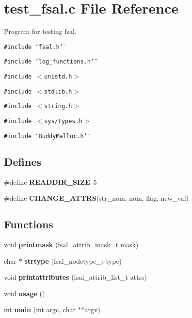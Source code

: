 \section{test\_\-fsal.c File Reference}
\label{test__fsal_8c}
Program for testing fsal.  


{\tt \#include \char`\"{}fsal.h\char`\"{}}\par
{\tt \#include \char`\"{}log\_\-functions.h\char`\"{}}\par
{\tt \#include $<$unistd.h$>$}\par
{\tt \#include $<$stdlib.h$>$}\par
{\tt \#include $<$string.h$>$}\par
{\tt \#include $<$sys/types.h$>$}\par
{\tt \#include \char`\"{}BuddyMalloc.h\char`\"{}}\par
\subsection*{Defines}
\begin{CompactItemize}
\item 
\#define \textbf{READDIR\_\-SIZE}~5\label{test__fsal_8c_23f27c010a8ef80f23da9070400f3244}

\item 
\#define \textbf{CHANGE\_\-ATTRS}(str\_\-nom, nom, flag, new\_\-val)
\end{CompactItemize}
\subsection*{Functions}
\begin{CompactItemize}
\item 
void \textbf{printmask} (fsal\_\-attrib\_\-mask\_\-t mask)\label{test__fsal_8c_97f533a652ce754b0d9faf4a52572e62}

\item 
char $\ast$ \textbf{strtype} (fsal\_\-nodetype\_\-t type)\label{test__fsal_8c_55da3e758cacb2e7378990063ef42124}

\item 
void \textbf{printattributes} (fsal\_\-attrib\_\-list\_\-t attrs)\label{test__fsal_8c_39093f42286fd46a5becd50e021cc4ae}

\item 
void \textbf{usage} ()\label{test__fsal_8c_2ef30c42cbc289d899a8be5d2d8f77d0}

\item 
int \textbf{main} (int argc, char $\ast$$\ast$argv)\label{test__fsal_8c_3c04138a5bfe5d72780bb7e82a18e627}

\end{CompactItemize}


